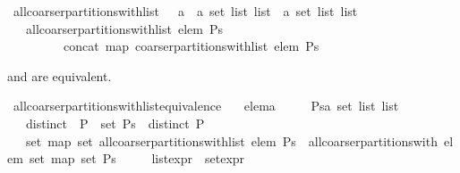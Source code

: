 \begin{isabellebody}
\isamarkuptrue%
\isamarkupfalse%
\ all{\isacharunderscore}coarser{\isacharunderscore}partitions{\isacharunderscore}with{\isacharunderscore}list\ {\isacharcolon}{\isacharcolon}\ {\isachardoublequoteopen}\ {\isacharprime}a\ {\isasymRightarrow}\ {\isacharprime}a\ set\ list\ list\ {\isasymRightarrow}\ {\isacharprime}a\ set\ list\ list{\isachardoublequoteclose}\isanewline
\ \ \ {\isachardoublequoteopen}all{\isacharunderscore}coarser{\isacharunderscore}partitions{\isacharunderscore}with{\isacharunderscore}list\ elem\ Ps\ {\isacharequal}\ \isanewline
\ \ \ \ \ \ \ \ \ concat\ {\isacharparenleft}map\ {\isacharparenleft}coarser{\isacharunderscore}partitions{\isacharunderscore}with{\isacharunderscore}list\ elem{\isacharparenright}\ Ps{\isacharparenright}{\isachardoublequoteclose}%
\begin{isamarkuptext}%
 and  are equivalent.%
\end{isamarkuptext}%
\isamarkuptrue%
\isamarkupfalse%
\ all{\isacharunderscore}coarser{\isacharunderscore}partitions{\isacharunderscore}with{\isacharunderscore}list{\isacharunderscore}equivalence{\isacharcolon}\isanewline
\ \ \ elem{\isacharcolon}{\isacharcolon}{\isacharprime}a\isanewline
\ \ \ \ \ Ps{\isacharcolon}{\isacharcolon}{\isachardoublequoteopen}{\isacharprime}a\ set\ list\ list{\isachardoublequoteclose}\isanewline
\ \ \ distinct{\isacharcolon}\ {\isachardoublequoteopen}{\isasymforall}\ P\ {\isasymin}\ set\ Ps\ {\isachardot}\ distinct\ P{\isachardoublequoteclose}\isanewline
\ \ \ {\isachardoublequoteopen}set\ {\isacharparenleft}map\ set\ {\isacharparenleft}all{\isacharunderscore}coarser{\isacharunderscore}partitions{\isacharunderscore}with{\isacharunderscore}list\ elem\ Ps{\isacharparenright}{\isacharparenright}\ {\isacharequal}\ all{\isacharunderscore}coarser{\isacharunderscore}partitions{\isacharunderscore}with\ elem\ {\isacharparenleft}set\ {\isacharparenleft}map\ set\ Ps{\isacharparenright}{\isacharparenright}{\isachardoublequoteclose}\isanewline
\ \ \ \ {\isacharparenleft}\ {\isachardoublequoteopen}{\isacharquery}list{\isacharunderscore}expr\ {\isacharequal}\ {\isacharquery}set{\isacharunderscore}expr{\isachardoublequoteclose}{\isacharparenright}\isanewline
%
\isadelimproof
%
\endisadelimproof
%
\isatagproof

\end{isabellebody}
